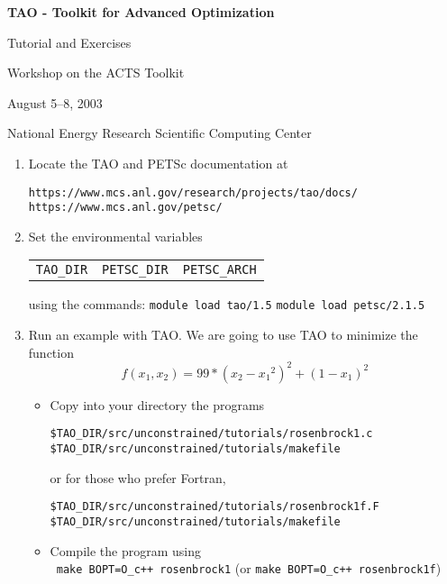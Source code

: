 \documentclass[11pt]{article}
\begin{document}
\begin{center}
{\bf
TAO - Toolkit for Advanced Optimization
        
Tutorial and Exercises

\vspace{0.25in}

Workshop on the ACTS Toolkit

August 5--8, 2003

National Energy Research Scientific Computing Center
}
\end{center}
\vspace{0.25in}

\begin{enumerate}

\item Locate the TAO and PETSc documentation at 
\begin{alltt}
https://www.mcs.anl.gov/research/projects/tao/docs/
https://www.mcs.anl.gov/petsc/
\end{alltt}

\item Set the environmental variables\\
\begin{tabular}{ccc}
\texttt{TAO\_DIR} & \texttt{PETSC\_DIR} & \texttt{PETSC\_ARCH} 
\end{tabular}
using the commands:
\quad \texttt{module load tao/1.5}
\quad \texttt{module load petsc/2.1.5}


\item Run an example with TAO.
We are going to use TAO to minimize the function 
\[
    f(x_1,x_2) = 99*(x_2-{x_1}^2)^2 + (1-x_1)^2 
\]

\begin{itemize}
 \item Copy into your directory the programs
  \begin{alltt}
    \$TAO_DIR/src/unconstrained/tutorials/rosenbrock1.c
    \$TAO_DIR/src/unconstrained/tutorials/makefile
  \end{alltt}
  or for those who prefer Fortran,
  \begin{alltt}
    \$TAO_DIR/src/unconstrained/tutorials/rosenbrock1f.F
    \$TAO_DIR/src/unconstrained/tutorials/makefile
  \end{alltt}

 \item Compile the program using \\
  \quad \texttt{ make BOPT=O\_c++ rosenbrock1} 
  (or \texttt{make BOPT=O\_c++ rosenbrock1f})


\end{itemize}
\end{enumerate}
\end{document}

